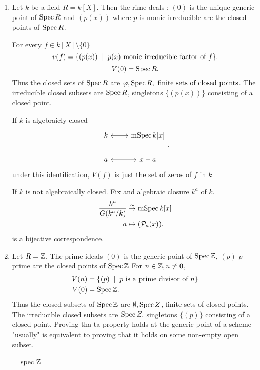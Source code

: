 \begin{example}
	\begin{enumerate}
		\item Let $k$ be a field $R = k[X]$. 
			Then the rime deals :  $(0)$ is the unique generic point of $\operatorname{Spec} R$ and $(p(x))$ where $p$ is monic irreducible are the closed points of $\operatorname{Spec} R$. 


			For every $f \in k[X] \setminus \{ 0\} $ \[
				v(f) = \{(p(x)) \st p(x) \text{ monic irreducible factor of $f$}\} 
			.\] 
			\[
				V(0) = \operatorname{Spec} R
			.\] 
		Thus the closed sets of $\operatorname{Spec} R$ are $\varphi, \operatorname{Spec} R, \text{ finite sets of closed points} $.
		The irreducible closed subsets are $\operatorname{Spec} R$, singletons $\{(p(x))\} $ consisting of a closed point.
		
		If  $k$ is algebraicly closed 
		\[
		\begin{tikzcd}
			k \arrow[r, leftrightarrow] & \mspec k[x] \\
			a \arrow[r, leftrightarrow] & x - a
		\end{tikzcd}
		.\] 
		under this identification, $V(f)$ is just the set of zeros of $f$ in $k$ 

		If $k$ is not algebraically closed. 
		Fix and algebraic closure $k^{a}$ of $k$. 
		\begin{align*}
			\frac{k^{a}}{G(k^{a} / k)} &\overset\sim\to  \operatorname{mSpec} k[x] \\
			a & \mapsto (\mathcal{P}_a(x))
		.\end{align*}
		is a bijective correspondence.


	\item Let $R =\mathbb{Z}$. The prime ideals $(0)$ is the generic point of $\operatorname{Spec} \mathbb{Z}$, $(p)$ $p$ prime are the closed points of $\operatorname{Spec} \mathbb{Z}$
		For $n \in \mathbb{Z}, n \ne 0$, 
		\begin{align*}
			V(n) &=  \{(p) \st p \text{ is a prime divisor of } n\}  \\
			V(0) &=  \spec \Z 
		.\end{align*}
		Thus the closed subsets of $\operatorname{Spec} \mathbb{Z}$ are $\emptyset, \operatorname{Spec} Z$, finite sets of closed points. 
		The irreducible closed subsets are $\operatorname{Spec} Z , $ singletons $\{(p)\} $ consisting of a closed point. 
		Proving tha ta property holds at the generic point of a scheme "usually" is equivalent to proving that it holds on some non-empty open subset.
	\end{enumerate}
\end{example}
\begin{figure}[ht]
    \centering
    \caption{spec Z}
    \label{fig:spec-z}
\end{figure}

